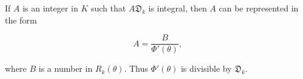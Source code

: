 If $A$ is an integer in $K$ such that $A\mathfrak{D}_k$ is integral, then $A$ can be represented in the form

$$A = \frac{B}{\Phi'(\theta)},$$

where $B$ is a number in $R_k(\theta)$. Thus $\Phi'(\theta)$ is divisible by $\mathfrak{D}_k$.
